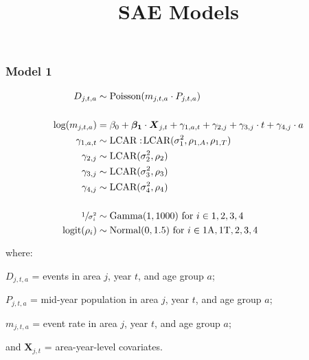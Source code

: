 \documentclass[12pt]{article}
\title{SAE Models}
\begin{document}
\maketitle

\subsubsection{Model 1}

	\begin{align*}
		D_{j,t,a} &\sim \text{Poisson}(m_{j,t,a} \cdot P_{j,t,a}) \\
		\\
		\text{log}(m_{j,t,a}) &= \beta_0 + \boldsymbol{\beta_1} \cdot \boldsymbol{X}_{j,t} + \gamma_{1,a,t} + \gamma_{2,j} + \gamma_{3,j} \cdot t + \gamma_{4,j} \cdot a \\
		\gamma_{1,a,t} &\sim \text{LCAR}:\!\text{LCAR}(\sigma^2_1, \rho_{1,A}, \rho_{1,T}) \\
		\gamma_{2,j} &\sim \text{LCAR}(\sigma^2_2, \rho_2) \\
		\gamma_{3,j} &\sim \text{LCAR}(\sigma^2_3, \rho_3) \\
		\gamma_{4,j} &\sim \text{LCAR}(\sigma^2_4, \rho_4) \\
		\\
		\sfrac{1}{\sigma^{2}_{i}} &\sim \text{Gamma}(1, 1000) \text{ for } i \in {1,2,3,4} \\
		\text{logit}(\rho_{i}) &\sim \text{Normal}(0, 1.5) \text{ for } i \in {\text{1A},\text{1T},2,3,4}
	\end{align*}

	where:
	\begin{description}
		\setlength{\itemsep}{0pt}
		\setlength{\parskip}{0pt}
		\setlength{\parsep}{0pt}
		\setlength{\itemindent}{5pt}
		\item $D_{j,t,a}$ = events in area $j$, year $t$, and age group $a$; \\
		\item $P_{j,t,a}$ = mid-year population in area $j$, year $t$, and age group $a$; \\
		\item $m_{j,t,a}$ = event rate in area $j$, year $t$, and age group $a$; \\
		\item and $\boldsymbol{X}_{j,t}$ = area-year-level covariates.
	\end{description}
\end{document}
